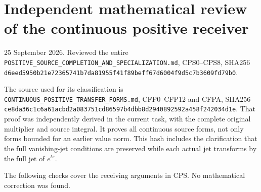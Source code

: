 \section{Independent mathematical review of the continuous positive
receiver}\label{independent-mathematical-review-of-the-continuous-positive-receiver}

25 September 2026. Reviewed the entire
\nolinkurl{POSITIVE_SOURCE_COMPLETION_AND_SPECIALIZATION.md},
CPS0--CPS8, SHA256
\nolinkurl{d6eed5950b21e72365741b7da81955f41f89beff67d6004f9d5c7b3609fd79b0}.

The source used for its classification is
\nolinkurl{CONTINUOUS_POSITIVE_TRANSFER_FORMS.md}, CFP0--CFP12 and CFPA,
SHA256
\nolinkurl{ce8da36c1c6a61acbd2a083751cd86597b4dbb8d2940892592a458f242034d1e}.
That proof was independently derived in the current task, with the
complete original multiplier and source integral. It proves all
continuous source forms, not only forms bounded for an earlier value
norm. This hash includes the clarification that the full vanishing-jet
conditions are preserved while each actual jet transforms by the full
jet of \(e^{ts}\).

The following checks cover the receiving arguments in CPS. No
mathematical correction was found.

